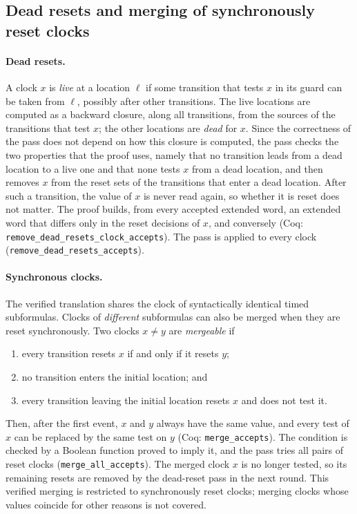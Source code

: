\subsection{Dead resets and merging of synchronously reset clocks}
\label{sec:dead-merge}\label{sec:main-dead-merge}
\paragraph{Dead resets.}
A clock $x$ is \emph{live} at a location $\ell$ if some transition that tests
$x$ in its guard can be taken from $\ell$, possibly after other transitions.
The live locations are computed as a backward closure, along all
transitions, from the sources of the transitions that test $x$; the other
locations are \emph{dead} for $x$.  Since the correctness of the pass does
not depend on how this closure is computed, the pass checks the two
properties that the proof uses, namely that no transition leads from a dead
location to a live one and that none tests $x$ from a dead location, and then removes $x$ from the reset sets of the
transitions that enter a dead location.  After such a transition, the value of
$x$ is never read again, so whether it is reset does not matter.  The proof
builds, from every accepted extended word, an extended word that differs only
in the reset decisions of $x$, and conversely (Coq:
\texttt{remove\_\allowbreak{}dead\_\allowbreak{}resets\_\allowbreak{}clock\_\allowbreak{}accepts}).  The pass is applied
to every clock (\texttt{remove\_\allowbreak{}dead\_\allowbreak{}resets\_\allowbreak{}accepts}).

\paragraph{Synchronous clocks.}
The verified translation shares the clock of syntactically identical timed
subformulas.  Clocks of \emph{different} subformulas can also be merged when
they are reset synchronously.  Two clocks $x\neq y$ are \emph{mergeable} if
\begin{enumerate}[label=(\roman*)]
  \item every transition resets $x$ if and only if it resets $y$;
  \item no transition enters the initial location; and
  \item every transition leaving the initial location resets $x$ and does not
        test it.
\end{enumerate}
Then, after the first event, $x$ and $y$ always have the same value, and every
test of $x$ can be replaced by the same test on $y$ (Coq:
\texttt{merge\_\allowbreak{}accepts}).  The condition is checked by a Boolean function
proved to imply it, and the pass tries all pairs of reset clocks
(\texttt{merge\_\allowbreak{}all\_\allowbreak{}accepts}).  The merged clock $x$ is no longer tested,
so its remaining resets are removed by the dead-reset pass in the next round.
This verified merging is restricted to synchronously reset clocks; merging
clocks whose values coincide for other reasons is not covered.

